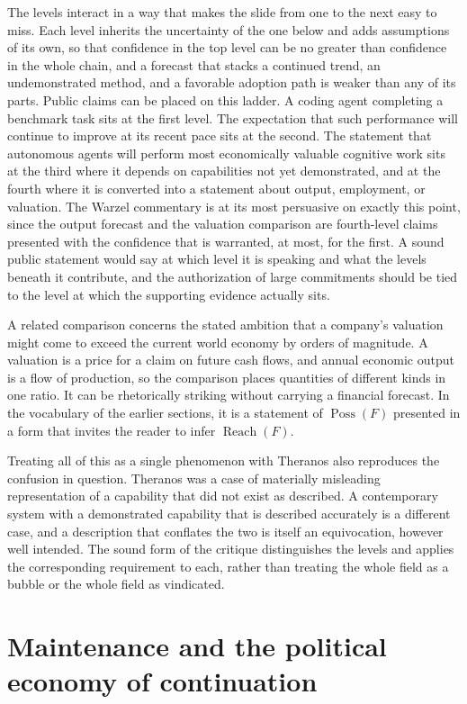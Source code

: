\documentclass[11pt]{article}
\theoremstyle{plain}
\theoremstyle{definition}
\theoremstyle{remark}
\newcommand{\Poss}{\operatorname{Poss}}
\newcommand{\Reach}{\operatorname{Reach}}
\begin{document}
The levels interact in a way that makes the slide from one to the next easy to miss. Each level inherits the uncertainty of the one below and adds assumptions of its own, so that confidence in the top level can be no greater than confidence in the whole chain, and a forecast that stacks a continued trend, an undemonstrated method, and a favorable adoption path is weaker than any of its parts. Public claims can be placed on this ladder. A coding agent completing a benchmark task sits at the first level. The expectation that such performance will continue to improve at its recent pace sits at the second. The statement that autonomous agents will perform most economically valuable cognitive work sits at the third where it depends on capabilities not yet demonstrated, and at the fourth where it is converted into a statement about output, employment, or valuation. The Warzel commentary is at its most persuasive on exactly this point, since the output forecast and the valuation comparison are fourth-level claims presented with the confidence that is warranted, at most, for the first. A sound public statement would say at which level it is speaking and what the levels beneath it contribute, and the authorization of large commitments should be tied to the level at which the supporting evidence actually sits.

A related comparison concerns the stated ambition that a company's valuation might come to exceed the current world economy by orders of magnitude. A valuation is a price for a claim on future cash flows, and annual economic output is a flow of production, so the comparison places quantities of different kinds in one ratio. It can be rhetorically striking without carrying a financial forecast. In the vocabulary of the earlier sections, it is a statement of $\Poss(F)$ presented in a form that invites the reader to infer $\Reach(F)$.

Treating all of this as a single phenomenon with Theranos also reproduces the confusion in question. Theranos was a case of materially misleading representation of a capability that did not exist as described. A contemporary system with a demonstrated capability that is described accurately is a different case, and a description that conflates the two is itself an equivocation, however well intended. The sound form of the critique distinguishes the levels and applies the corresponding requirement to each, rather than treating the whole field as a bubble or the whole field as vindicated.

\section{Maintenance and the political economy of continuation}
\end{document}
